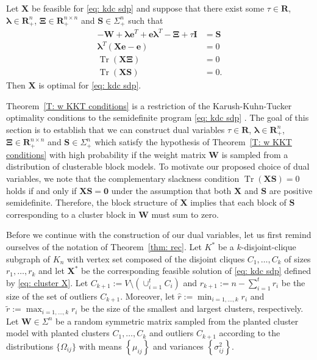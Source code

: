 \documentclass[twoside,11pt]{article}
\renewcommand{\S}{\mathbf{S}}
\newcommand{\R}{\mathbf{R}}
\DeclareMathOperator{\tr}{{Tr}}
\newcommand{\e}{\bs {e}}
\newcommand{\bs}{\boldsymbol}
\newcommand{\X}{\bs {X}}
\newcommand{\W}{\bs {W}}
\newcommand{\0}{\bs{0}}
\newcommand{\bra}[1]{\ensuremath{\left\{ #1 \right\}}} %
\begin{document}
{\renewcommand{\S}{\bs{S}}
\begin{theorem}
	\label{T:  w KKT conditions}
	Let $\X$ be feasible for \eqref{eq: kdc sdp} and suppose that
	there exist some $\tau \in \R$, $\bs\lambda \in \R^n_+$, $\bs\Xi \in \R^{n\times n}_{+}$ and $\S \in \Sigma^n_+$ such that
	\begin{align}
	- \W + \bs\lambda \e^T + \e \bs\lambda^T - \bs\Xi + \tau \bs I &= \S \label{E: w dual feas} \\
	\bs\lambda^T (\X\e - \e)  &= 0  \label{E: w CS rowsum} \\
	\tr(\X  \bs\Xi) &= 0 \label{E: w CS nonneg} \\
	\tr (\X \S)  &= 0. \label{E: w CS sdp}
	\end{align}
	Then $\X$ is optimal for \eqref{eq: kdc sdp}.
\end{theorem}

Theorem~\ref{T: w KKT conditions} is a restriction of the Karush-Kuhn-Tucker optimality conditions
to the semidefinite program \eqref{eq: kdc sdp} \citep[see for example][Section 5.5.3]{boyd2009convex}.
The goal of this section is to establish that we can construct dual variables $\tau \in \R$, $\bs\lambda \in \R^n_+$, $\bs\Xi \in \R^{n\times n}_{+}$ and $\S \in \Sigma^n_+$
which satisfy the hypothesis
of Theorem~\eqref{T: w KKT conditions} with high probability if the weight matrix \(\W\) is
sampled from a distribution of clusterable block models.
To motivate our proposed choice of dual variables, we note that
the complementary slackness condition \(\tr(\X\S) = 0\) holds if and only if \(\X\S = \bs 0\) under the assumption that
both \(\X\) and \(\S\) are positive semidefinite.
Therefore, the block structure of \(\X\) implies that
each block of \(\S\) corresponding to a cluster block in \(\W\) must sum to zero.

Before we continue with the construction of our dual variables, let us first remind ourselves
of the notation of Theorem~\ref{thm: rec}.
Let $K^*$ be a $k$-disjoint-clique subgraph of $K_n$ with vertex set composed of the disjoint cliques $C_1, \dots, C_k$ of sizes $r_1, \dots, r_k$  and let
$\X^*$ be the corresponding feasible solution of \eqref{eq: kdc sdp} defined by \eqref{eq: cluster X}.
Let $C_{k+1} := V \setminus  (\cup^t_{i=1} C_i)$ and $r_{k+1} := n - \sum_{i=1}^t r_i$ be the size of the set
of outliers \(C_{k+1}\).
Moreover, let $\hat r := \min_{i=1, \dots, k} r_i$ and
\( \tilde r := \max_{i=1,\dots, k} r_i\)  be the size of the smallest and largest clusters,
respectively.
Let $\W \in \Sigma^n$ be a random symmetric matrix
sampled from the planted cluster model with planted clusters \(C_1, \dots, C_k\) and
outliers \(C_{k+1}\)
according to the distributions \(\{\Omega_{ij}\}\) with means \( \bra{\mu_{ij}} \)
and variances $\bra{\sigma^2_{ij}}$.

}
\end{document}
